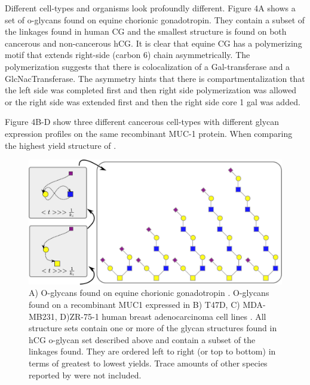 \documentclass[twocolumn]{article}
\begin{document}
Different cell-types and organisms look profoundly different. Figure 4A shows a set of o-glycans found on equine chorionic gonadotropin. They contain a subset of the linkages found in human CG and the smallest structure is found on both cancerous and non-cancerous hCG. It is clear that equine CG has a polymerizing motif that extends right-side (carbon 6) chain asymmetrically. The polymerization suggests that there is colocalization of a Gal-transferase and a GlcNacTransferase. The asymmetry hints that there is compartmentalization that the left side was completed first and then right side polymerization was allowed or the right side was extended first and then the right side core 1 gal was added. 

Figure 4B-D show three different cancerous cell-types with different glycan expression profiles on the same recombinant MUC-1 protein. When comparing the highest yield structure of . 


\begin{figure}[t]
    \includegraphics[width=\textwidth]{Figure_6.pdf}
	\caption{A) O-glycans found on equine chorionic gonadotropin \cite{Hokke1994}. O-glycans found on a recombinant MUC1 expressed in B) T47D, C) MDA-MB231, D)ZR-75-1 human breast adenocarcinoma cell lines \cite{Muller2002}. All structure sets contain one or more of the glycan structures found in hCG o-glycan set described above and contain a subset of the linkages found. They are ordered left to right (or top to bottom) in terms of greatest to lowest yields. Trace amounts of other species reported by \cite{Muller2002} were not included.}
\end{figure}
\end{document}
